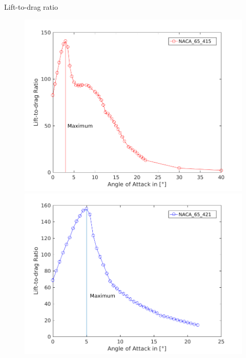\documentclass[12pt,t]{beamer}
\begin{document}
\begin{frame}
\huge
Lift-to-drag ratio
\begin{figure}[htbp]
	\begin{center}
		\begin{minipage}[t]{0.4\linewidth}
			\centering
			\includegraphics[width=\linewidth]{figures/lift_to_drag_ratio_415.png}
		\end{minipage}
		\begin{minipage}[t]{0.4\linewidth}
			\centering
			\includegraphics[width=\linewidth]{figures/lift_to_drag_ratio_421.png}
		\end{minipage}
	\end{center}
\end{figure}

\end{frame}
\end{document}
